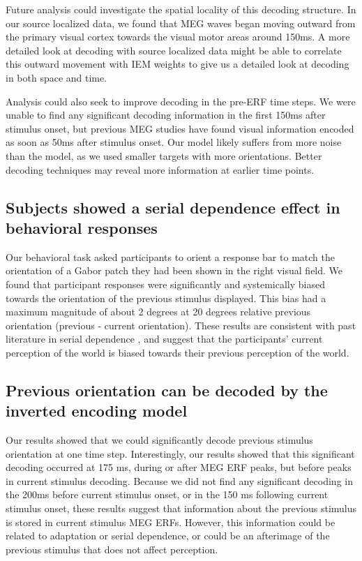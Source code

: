 \documentclass[../main.tex]{subfiles}
\begin{document}
Future analysis could investigate the spatial locality of this decoding structure. In our source localized data, we found that MEG waves began moving outward from the primary visual cortex towards the visual motor areas around 150ms. A more detailed look at decoding with source localized data might be able to correlate this outward movement with IEM weights to give us a detailed look at decoding in both space and time.

Analysis could also seek to improve decoding in the pre-ERF time steps. We were unable to find any significant decoding information in the first 150ms after stimulus onset, but previous MEG studies \citep{cichy_ramirez_pantazis_2015} have found visual information encoded as soon as 50ms after stimulus onset. Our model likely suffers from more noise than the \cite{cichy_ramirez_pantazis_2015} model, as we used smaller targets with more orientations. Better decoding techniques may reveal more information at earlier time points.


\subsection{Subjects showed a serial dependence effect in behavioral responses}
Our behavioral task asked participants to orient a response bar to match the orientation of a Gabor patch they had been shown in the right visual field. We found that participant responses were significantly and systemically biased towards the orientation of the previous stimulus displayed. This bias had a maximum magnitude of about 2 degrees at 20 degrees relative previous orientation (previous - current orientation). These results are consistent with past literature in serial dependence \citep{fischer_whitney_2014, Manassi}, and suggest that the participants' current perception of the world is biased towards their previous perception of the world.

\subsection{Previous orientation can be decoded by the inverted encoding model}
Our results showed that we could significantly decode previous stimulus orientation at one time step. Interestingly, our results showed that this significant decoding occurred at 175 ms, during or after  MEG ERF peaks, but before peaks in current stimulus decoding. Because we did not find any significant decoding in the 200ms before current stimulus onset, or in the 150 ms following current stimulus onset, these results suggest that information about the previous stimulus is stored in current stimulus MEG ERFs. However, this information could be related to adaptation or serial dependence, or could be an afterimage of the previous stimulus that does not affect perception.
\end{document}
